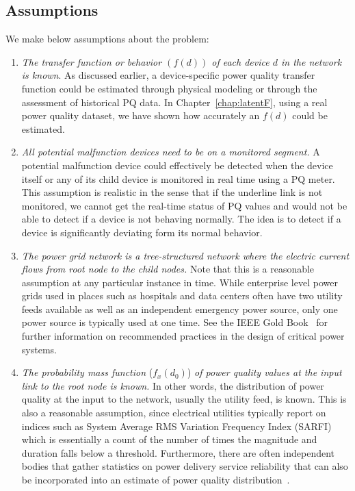 \documentclass[12pt,oneside]{book}
\begin{document}
\subsection{Assumptions}
We make below assumptions about the problem:
\begin{enumerate}
\item \textit{The transfer function or behavior $\left(f\left(d\right)\right)$ of each device $d$ in the network is known}. As discussed earlier, a device-specific power quality transfer function could be estimated through physical modeling or through the assessment of historical PQ data. In Chapter~\ref{chap:latentF}, using a real power quality dataset, we have shown how accurately an $f(d)$ could be estimated.

\item \textit{All potential malfunction devices need to be on a monitored segment.} A potential malfunction device could effectively be detected when the device itself or any of its child device is monitored in real time using a PQ meter. This assumption is realistic in the sense that if the underline link is not monitored, we cannot get the real-time status of PQ values and would not be able to detect if a device is not behaving normally. The idea is to detect if a device is significantly deviating form its normal behavior.

\item \textit{The power grid network is a tree-structured network where the electric current flows from root node to the child nodes.} Note that this is a reasonable assumption at any particular instance in time. While enterprise level power grids used in places such as hospitals and data centers often have two utility feeds available as well as an independent emergency power source, only one power source is typically used at one time. See the IEEE Gold Book~\cite{goldbook} for further information on recommended practices in the design of critical power systems.

\item \textit{The probability mass function} ($f_x\left(d_0\right)$)\textit{ of power quality values at the input link to the root node is known.} In other words, the distribution of power quality at the input to the network, usually the utility feed, is known. This is also a reasonable assumption, since electrical utilities typically report on indices such as System Average RMS Variation Frequency Index (SARFI) which is essentially a count of the number of times the magnitude and duration falls below a threshold. Furthermore, there are often independent bodies that gather statistics on power delivery service reliability that can also be incorporated into an estimate of power quality distribution~\cite{chowdhury2004reliability}.
\end{enumerate}
\end{document}
